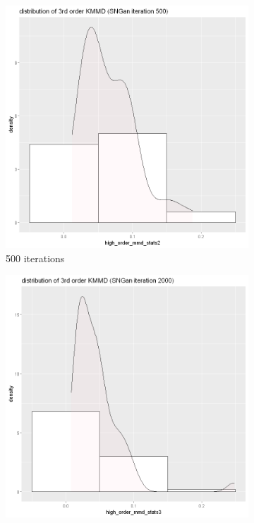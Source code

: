 \documentclass{article}
\begin{document}
\begin{figure}[h!]
    \caption{Dataset Face}
     \centering
     \begin{subfigure}[b]{0.3\textwidth}
         \centering
         \includegraphics[width=\textwidth]{kmmd_figures/sngan_face_highdist_500.png}
         \caption{500 iterations}
     \end{subfigure}
     \hfill
     \begin{subfigure}[b]{0.3\textwidth}
         \centering
         \includegraphics[width=\textwidth]{kmmd_figures/sngan_face_highdist_2000.png}

\end{subfigure}
\end{figure}
\end{document}
